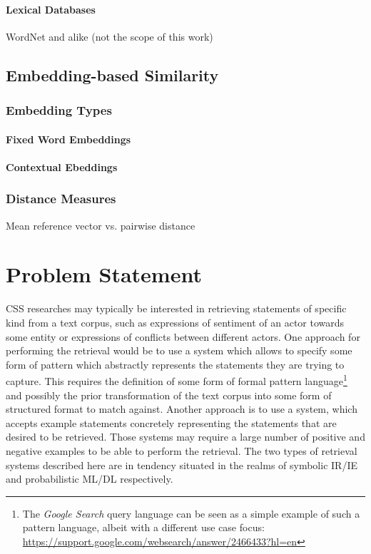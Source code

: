 \documentclass[11pt]{scrreprt}
\begin{document}
\subsubsection{Lexical Databases}
WordNet and alike (not the scope of this work)


\section{Embedding-based Similarity}

\subsection{Embedding Types}

\subsubsection{Fixed Word Embeddings}

\subsubsection{Contextual Ebeddings}


\subsection{Distance Measures}

Mean reference vector vs. pairwise distance

\chapter{Problem Statement}
\label{cha:problem-statement}
CSS researches may typically be interested in retrieving statements of specific kind from a text corpus, such as expressions of sentiment of an actor towards some entity or expressions of conflicts between different actors. One approach for performing the retrieval would be to use a system which allows to specify some form of pattern which abstractly represents the statements they are trying to capture. This requires the definition of some form of formal pattern language\footnote{The \textit{Google Search} query language can be seen as a simple example of such a pattern language, albeit with a different use case focus: \url{https://support.google.com/websearch/answer/2466433?hl=en}} and possibly the prior transformation of the text corpus into some form of structured format to match against. Another approach is to use a system, which accepts example statements concretely representing the statements that are desired to be retrieved. Those systems may require a large number of positive and negative examples to be able to perform the retrieval. The two types of retrieval systems described here are in tendency situated in the realms of symbolic IR/IE and probabilistic ML/DL respectively.
\end{document}
